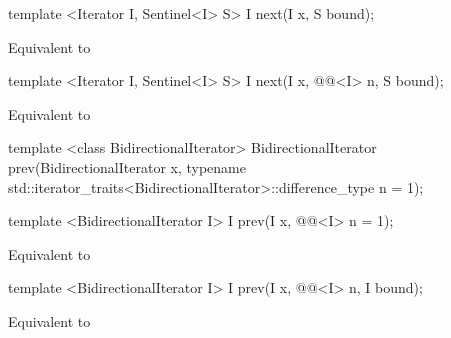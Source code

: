 \begin{addedblock}
\begin{itemdecl}
template <Iterator I, Sentinel<I> S>
  I next(I x, S bound);
\end{itemdecl}

\begin{itemdescr}
\pnum
\effects Equivalent to 
\end{itemdescr}

\begin{itemdecl}
template <Iterator I, Sentinel<I> S>
  I next(I x, @@<I> n, S bound);
\end{itemdecl}

\begin{itemdescr}
\pnum
\effects Equivalent to 
\end{itemdescr}
\end{addedblock}

%
\begin{removedblock}
\begin{itemdecl}
template <class BidirectionalIterator>
  BidirectionalIterator prev(BidirectionalIterator x,
    typename std::iterator_traits<BidirectionalIterator>::difference_type n = 1);
\end{itemdecl}
\end{removedblock}
\begin{addedblock}
\begin{itemdecl}
template <BidirectionalIterator I>
  I prev(I x, @@<I> n = 1);
\end{itemdecl}
\end{addedblock}

\begin{itemdescr}
\pnum
\effects Equivalent to 
\end{itemdescr}

\begin{addedblock}
\begin{itemdecl}
template <BidirectionalIterator I>
  I prev(I x, @@<I> n, I bound);
\end{itemdecl}

\begin{itemdescr}
\pnum
\effects Equivalent to 
\end{itemdescr}
\end{addedblock}

